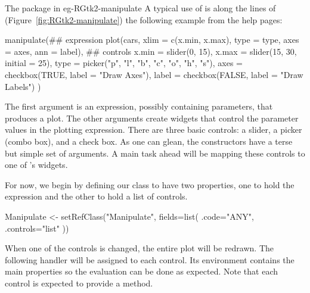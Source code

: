 \begin{example}{The  package in }{eg-RGtk2-manipulate}
A typical use of  is along the lines of
(Figure~\ref{fig:RGtk2-manipulate}) the following example from the
 help pages:
\begin{Schunk}
\begin{Sinput}
 manipulate(## expression
            plot(cars, xlim = c(x.min, x.max), type = type, 
                 axes = axes, ann = label),
            ## controls
            x.min = slider(0, 15),
            x.max = slider(15, 30, initial = 25),
            type = picker("p", "l", "b", "c", "o", "h", "s"),
            axes = checkbox(TRUE, label = "Draw Axes"),
            label = checkbox(FALSE, label = "Draw Labels")
            )
\end{Sinput}
\end{Schunk}
%
The first argument is an expression, possibly containing parameters,
that produces a plot. The other arguments create widgets that
control the parameter values in the plotting expression. There are
three basic controls: a slider, a picker (combo box), and a check
box. As one can glean, the constructors have a terse but simple set
of arguments. A main task ahead will be mapping these controls to one
of \GTK's widgets.

For now, we begin by defining our  class to have two
properties, one to hold the expression and the other to hold a list of controls.
\begin{Schunk}
\begin{Sinput}
 Manipulate <- setRefClass("Manipulate",
                           fields=list(
                             .code="ANY",
                             .controls="list"
                             ))
\end{Sinput}
\end{Schunk}
%



When one of the controls is changed, the entire plot will be
redrawn. The following handler will be assigned to each control. Its
environment contains the main properties so the evaluation can be done
as expected. Note that each control is expected to provide a
 method.

\begin{Schunk}
\end{Schunk}
%


\end{example}
